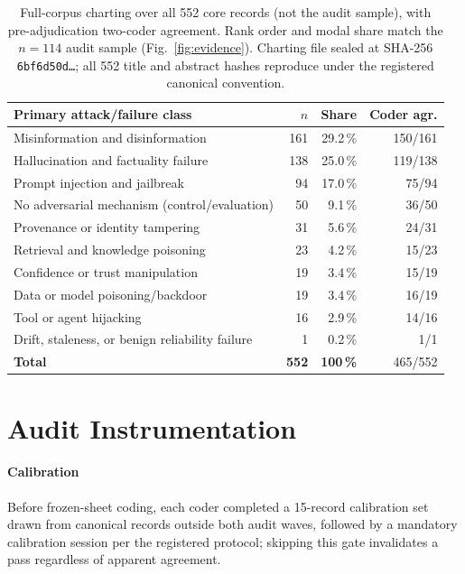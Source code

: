 \documentclass[conference]{IEEEtran}
\begin{document}
\begin{table}[t]
\centering\footnotesize
\caption{Full-corpus charting over all 552 core records (not the
audit sample), with pre-adjudication two-coder agreement. Rank
order and modal share match the $n{=}114$ audit sample
(Fig.~\ref{fig:evidence}). Charting file sealed at SHA-256
\texttt{6bf6d50d\ldots}; all 552 title and abstract hashes
reproduce under the registered canonical convention.}
\label{tab:fullcorpus}
\begin{tabularx}{\linewidth}{@{}Xrrr@{}}
\toprule
Primary attack/failure class & $n$ & Share & Coder agr. \\
\midrule
Misinformation and disinformation & 161 & 29.2\,\% & 150/161 \\
Hallucination and factuality failure & 138 & 25.0\,\% & 119/138 \\
Prompt injection and jailbreak & 94 & 17.0\,\% & 75/94 \\
No adversarial mechanism (control/evaluation) & 50 & 9.1\,\% & 36/50 \\
Provenance or identity tampering & 31 & 5.6\,\% & 24/31 \\
Retrieval and knowledge poisoning & 23 & 4.2\,\% & 15/23 \\
Confidence or trust manipulation & 19 & 3.4\,\% & 15/19 \\
Data or model poisoning/backdoor & 19 & 3.4\,\% & 16/19 \\
Tool or agent hijacking & 16 & 2.9\,\% & 14/16 \\
Drift, staleness, or benign reliability failure & 1 & 0.2\,\% & 1/1 \\
\midrule
\textbf{Total} & \textbf{552} & \textbf{100\,\%} & 465/552 \\
\bottomrule
\end{tabularx}
\end{table}

\section{Audit Instrumentation}
\label{app:audit}
\paragraph{Calibration}
Before frozen-sheet coding, each coder completed a 15-record
calibration set drawn from canonical records outside both audit
waves, followed by a mandatory calibration session per the
registered protocol; skipping this gate invalidates a pass
regardless of apparent agreement.
\end{document}
